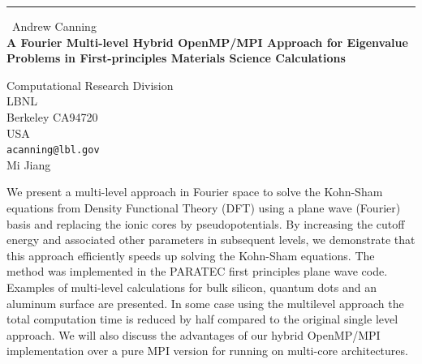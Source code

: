 \documentclass{report}
\begin{document}
\begin{center}
\rule{6in}{1pt} \
{\large Andrew Canning \\
{\bf A Fourier Multi-level Hybrid OpenMP/MPI Approach for Eigenvalue Problems in First-principles Materials Science Calculations }}

Computational Research Division \\ LBNL \\ Berkeley CA94720 \\ USA
\\
{\tt acanning@lbl.gov}\\
Mi Jiang\end{center}

We present a multi-level approach in Fourier space to solve the Kohn-Sham
equations from Density Functional Theory (DFT) using a plane wave
(Fourier) basis and replacing the ionic cores by pseudopotentials. By
increasing the cutoff energy and associated other parameters in
subsequent levels, we demonstrate that this approach efficiently speeds
up solving the Kohn-Sham equations. The method was implemented in the
PARATEC first principles plane wave code. Examples of multi-level
calculations for bulk silicon, quantum dots and an aluminum
surface are presented. In some case using the multilevel approach the
total computation time is reduced by half compared to the original single
level approach.
We will also discuss the advantages of our hybrid OpenMP/MPI
implementation over a pure MPI version for running on multi-core
architectures.
\end{document}
